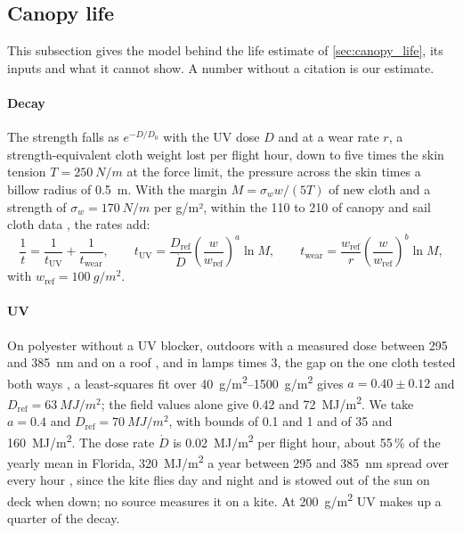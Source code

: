 \subsection{Canopy life}
\label{sec:det_canopy_life}

This subsection gives the model behind the life estimate of \cref{sec:canopy_life}, its inputs and what it cannot show. A number without a citation is our estimate.

\paragraph{Decay} The strength falls as $e^{-D/D_0}$ with the UV dose $D$ and at a wear rate $r$, a strength-equivalent cloth weight lost per flight hour, down to five times the skin tension $T=\SI{250}{N/m}$ at the force limit, the pressure across the skin times a billow radius of \SI{0.5}{m}. With the margin $M=\sigma_w w/(5T)$ of new cloth and a strength of $\sigma_w=\SI{170}{N/m}$ per g/m², within the 110 to 210 of canopy and sail cloth data \citep{porcher2006skytex_tds,ambroziak2018}, the rates add:
\begin{equation}
\frac{1}{t}=\frac{1}{t_\mathrm{UV}}+\frac{1}{t_\mathrm{wear}},\qquad
t_\mathrm{UV} = \frac{D_\mathrm{ref}}{\dot D}\left(\frac{w}{w_\mathrm{ref}}\right)^{a}\ln M,\qquad
t_\mathrm{wear} = \frac{w_\mathrm{ref}}{r}\left(\frac{w}{w_\mathrm{ref}}\right)^{b}\ln M,
\label{eq:uv_life}
\end{equation}
with $w_\mathrm{ref}=\SI{100}{g/m^2}$.

\paragraph{UV} On polyester without a UV blocker, outdoors with a measured dose between 295 and \SI{385}{nm} \citep{lodi2008,stevens2018} and on a roof \citep{hunt2022}, and in lamps \citep{ceylan2023,asadi2021,uzumcu2024,dekanic2023} times 3, the gap on the one cloth tested both ways \citep{stevens2018}, a least-squares fit over \SIrange{40}{1500}{g/m^2} gives $a=0.40\pm0.12$ and $D_\mathrm{ref}=\SI{63}{MJ/m^2}$; the field values alone give 0.42 and \SI{72}{MJ/m^2}. We take $a=0.4$ and $D_\mathrm{ref}=\SI{70}{MJ/m^2}$, with bounds of 0.1 and 1 and of 35 and \SI{160}{MJ/m^2}. The dose rate $\dot D$ is \SI{0.02}{MJ/m^2} per flight hour, about 55\,\% of the yearly mean in Florida, \SI{320}{MJ/m^2} a year between 295 and \SI{385}{nm} spread over every hour \citep{qlab2026}, since the kite flies day and night and is stowed out of the sun on deck when down; no source measures it on a kite. At \SI{200}{g/m^2} UV makes up a quarter of the decay.

